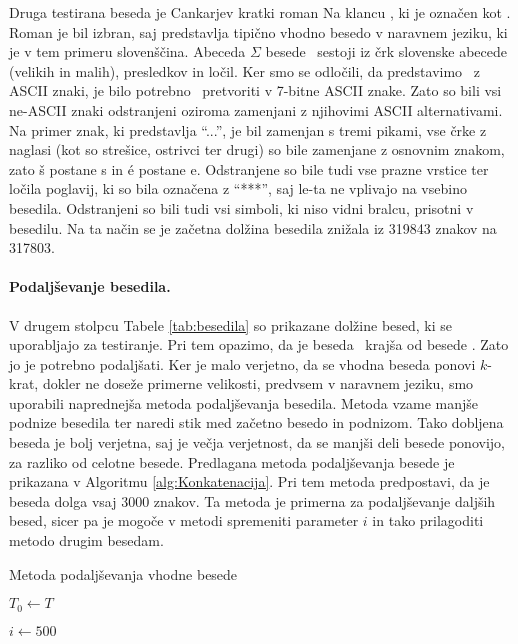 Druga testirana beseda je Cankarjev kratki roman Na klancu \cite{podatkiNaKlancu}, ki je označen kot \NK. Roman je bil izbran, saj predstavlja tipično vhodno besedo v naravnem jeziku, ki je v tem primeru slovenščina. Abeceda $\Sigma$ besede \NK\ sestoji iz črk slovenske abecede (velikih in malih), presledkov in ločil. Ker smo se odločili, da predstavimo \DNK\ z ASCII znaki, je bilo potrebno \NK\ pretvoriti v 7-bitne ASCII znake. Zato so bili vsi ne-ASCII znaki odstranjeni oziroma zamenjani z njihovimi ASCII alternativami. Na primer znak, ki predstavlja \enquote{...}, je bil zamenjan s tremi pikami, vse črke z naglasi (kot so strešice, ostrivci ter drugi) so bile zamenjane z osnovnim znakom, zato š postane s in é postane e. Odstranjene so bile tudi vse prazne vrstice ter ločila poglavij, ki so bila označena z \enquote{***}, saj le-ta ne vplivajo na vsebino besedila. Odstranjeni so bili tudi vsi simboli, ki niso vidni bralcu, prisotni v besedilu. Na ta način se je začetna dolžina besedila znižala iz 319843 znakov na 317803.

\paragraph{Podaljševanje besedila.}

V drugem stolpcu Tabele \ref{tab:besedila} so prikazane dolžine besed, ki se uporabljajo za testiranje. Pri tem opazimo, da je beseda \NK\ krajša od besede \DNK. Zato jo je potrebno podaljšati. Ker je malo verjetno, da se vhodna beseda ponovi $k$-krat, dokler ne doseže primerne velikosti, predvsem v naravnem jeziku, smo uporabili naprednejša metoda podaljševanja besedila. Metoda vzame manjše podnize besedila ter naredi stik med začetno besedo in podnizom. Tako dobljena beseda je bolj verjetna, saj je večja verjetnost, da se manjši deli besede ponovijo, za razliko od celotne besede. Predlagana metoda podaljševanja besede je prikazana v Algoritmu \ref{alg:Konkatenacija}. Pri tem metoda predpostavi, da je beseda dolga vsaj $3000$ znakov. Ta metoda je primerna za podaljševanje daljših besed, sicer pa je mogoče v metodi spremeniti parameter $i$ in tako prilagoditi metodo drugim besedam.


\begin{algorithm}[htb]

\caption{Metoda podaljševanja vhodne besede}\label{alg:Konkatenacija}
{
    {$T_0\leftarrow T$}

    {$i\leftarrow 500$}
    
    
}
\end{algorithm}

